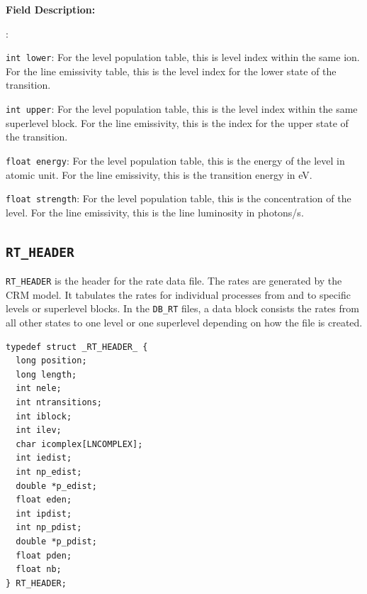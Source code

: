 \documentclass[twoside,letterpaper]{refrep}
\newenvironment{dbdesc}{\textbf{Field Description:} \begin{list}
	{:}{\setlength{\labelwidth}{2in}
	   \setlength{\leftmargin}{2in}
	   \setlength{\labelsep}{0.1in}
	   \setlength{\rightmargin}{0.2in}}}
	{\end{list}}
\begin{document}
\begin{dbdesc}
\item[\texttt{int lower}:] For the level population table, this is level index
within the same ion. For the line emissivity table, this is the level index for
the lower state of the transition.
\item[\texttt{int upper}:] For the level population table, this is the level
index within the same superlevel block. For the line emissivity, this is the
index for the upper state of the transition.
\item[\texttt{float energy}:] For the level population table, this is the
energy of the level in atomic unit. For the line emissivity, this is the
transition energy in eV.
\item[\texttt{float strength}:] For the level population table, this is the
concentration of the level. For the line emissivity, this is the line
luminosity in photons/s. 
\end{dbdesc}

\subsection{\texttt{RT\_HEADER}}
\label{subsec:rt_header}
\texttt{RT\_HEADER} is the header for the rate data file. The rates are
generated by the CRM model. It tabulates the rates for individual processes
from and to specific levels or superlevel blocks. In the \texttt{DB\_RT}
files, a data block consists the rates from all other states to one level or
one superlevel depending on how the file is created.

\begin{verbatim}
typedef struct _RT_HEADER_ { 
  long position;
  long length;
  int nele;
  int ntransitions;
  int iblock;
  int ilev;
  char icomplex[LNCOMPLEX];
  int iedist;
  int np_edist;
  double *p_edist;
  float eden;
  int ipdist;
  int np_pdist;
  double *p_pdist;
  float pden;
  float nb;
} RT_HEADER;
\end{verbatim}
\end{document}
